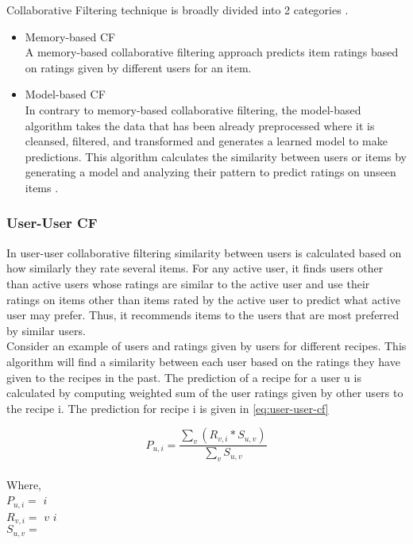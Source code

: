 \noindent Collaborative Filtering technique is broadly divided into 2 categories \cite{11}. 
\begin{itemize}
\item Memory-based CF \\
A memory-based collaborative filtering approach predicts item ratings based on ratings given by different users for an item.
\item Model-based CF \\
In contrary to memory-based collaborative filtering, the model-based algorithm takes the data that has been already preprocessed where it is cleansed, filtered, and transformed and generates a learned model to make predictions. This algorithm calculates the similarity between users or items by generating a model and analyzing their pattern to predict ratings on unseen items \cite{28,29,30}.
\end{itemize}

\subsubsection{User-User CF}

In user-user collaborative filtering similarity between users is calculated based on how similarly they rate several items. For any active user, it finds users other than active users whose ratings are similar to the active user and use their ratings on items other than items rated by the active user to predict what active user may prefer. Thus, it recommends items to the users that are most preferred by similar users.
\\
Consider an example of users and ratings given by users for different recipes. This algorithm will find a similarity between each user based on the ratings they have given to the recipes in the past. The prediction of a recipe for a user u is calculated by computing weighted sum of the user ratings given by other users to the recipe i.
The prediction for recipe i is given in \autoref{eq:user-user-cf}

\begin{equation}
P_{u,i} = \frac { \sum_v(R_{v,i} * S_{u,v})}{\sum_v S_{u,v}}
\label{eq:user-user-cf}
\end{equation}
\\
Where, 
\\
\noindent
$P_{u,i} = $  $i$ 
\\
$R_{v,i} = $  $v$  $i$ 
\\
$S_{u,v} = $ 
\\

